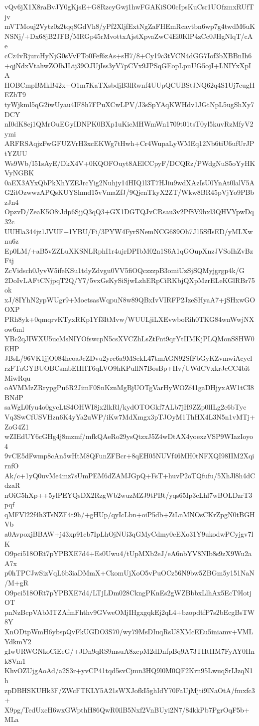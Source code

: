 vQv6jX1X8raBvJY0gKjsE+G8RzcyGwj1hwFGAKiSO0cIpsKuCsr1UOfzmxRUfTjv
mVTMouj2Vytz0z2tqq8GdVh8/yPf2XljfExtNgZaFHEmRcavtbn6wp7g4twdM6uK
NSNj/+Dx68jB2JFB/MRGp45rMvottxAjstXpvaZwC4Ei0KlP4zCc0JHgNlqT/cAe
cCz4vRjurcHyNjG0sVvFTo0Fef6zAs+sH7/8+Cy19c3tVCN4dGG7Iof3bXBBnIh6
+qjNdxVtahwZOlbJLtj39OJUjIss3yV7pCVx9JPSqGEopLpuUG5ojI+LNIYxXpIA
HOBCmpBMkB42x+O1m7KaTXsbdjB3lRwnf4UUpQCUBStJNQ62q4S1Uj7cugHEZhT9
tyWjkml5qG2iwUyau4IF8h7FPuXCwLPV/J3sSpYAqKWHdv1JGtNpL5ugShXy7DCY
nI0dK8cj1QMrOuEGyIDNPK0BXp1uKicMHWmWn1709t01tsT0yl5kuvRzMfyV2ymi
ARFRSAqjzFwGFUZVrH3xcEKWg7tHwh+Cr4WupaLyWMEq12Nb6tiU6ufUrJPtYZUU
Ws9Wb/I51sAyE/DkX4V+0KQOFOuyt8AElCCpyF/DCQRz/PWdgNuS5oYyHKVyNGBK
0aEX3AYxQbPkXhYZEJrcYig2Nuhjy14HIQ1l3T7HJiu9wdXAzIsU0YnAt0lalV5A
G2itOzwwzAPQsKUYShmd15vVmaZfJ/9QjenTkyX2ZT/Wkw8BR45pVjYo9PBbzJn4
OpzvD/ZeaK5O8iJdp6SjjQ3qQ3+GX1DGTQJvCRsau3v2Pf8V9hxl3QHVYpwDq32c
UUHla344jz1JVUF+1YBU/Fi/3PYW4FyrSNemNCG689Oh7J15SfIsED/yMLXwnu6z
Ep0LM/+aB5vZZLuXKSNLRphI1r4ujrDPIbM02n1S6A1qGOupXnzJVSoIhZvBzFtj
ZcVidsch0JyvW5ifeKSu1tdyZdvgu0VV5fiOQczzzpB3omiUzSjSQMyjgrgp4k/G
2DoIvLAFtCNjpqT2Q/Y7/5vxGsKySiSjwLzhERpCiRKbjQXpMzrELeKGlRBr75ok
xJ/8IYhN2ypWUgr9+MoetsasWqpuN8w89QBxIvVIRFP2JzeSHyaA7+jSHxwGOOXP
PRh8yk+0qmqrvKTyxRKp1Yf3ItMvw/WUULjiLXEvwboRih0TKG84wnWwjNXow6ml
YBc2qJIWXU5ucMsNIYOfswcpN5csXVCZhLsZtFnt9qrYtIIMKjPLQMonS8HW0EHP
JBsL/96VK1jjO084heoaJcZDvu2yre6a9MSekL47tmAGN92SfFbGyKZvmwiAcycl
rzFTuGYBUOBCsmbEHHT6qLVO9hKPullN7BosBp+Hv/UWdCVxkrJcCC4bitMiwRqu
oAVMMzZRrypgPu6R2JimF0SnKznMgBjUOTgVarHyWOZf41gaDHjyxAW1tCI8BNdP
saWgL0fyu4o0gycLtS4OHWI8jx2lkRl/kydOTOGkf7ALb7jH9ZZp0lILg2c6bTyc
Vq3SwCfUSVHzn6K4yYa2uWP/iKw7MdXmgx3pTJOyM1ThHX4L3N5n1vMTj+ZoG4Z1
wZIEdUY6cGHg4j8mzmf/mfkQAeRo29ysQtzxJ5Z4wDtAX4yoexzVSP9WIazIoyo4
9vCE5dFwmp8cAn5wHtM8QFunZFBcr+8qEH05NUVf46MH0tNFXQI98IIM2XqirnfO
Ak/c+1yQ0uvMe4mz7sUmPEM6dZAMJGpQ+FsT+huvP2oTQfufu/5XhJl8h4dCdzaR
nOiG5hXp++5ylPEYQsDX2RzgWb2wuzMZJ9tPBt/yqs65Ip3cLhl7wBOLDzrT3pqf
qMFVl22f4h3TsNZF4t9h/+gHUp/qyIcLbn+oiP5db+ZiLnMNOsCKrZpgN0tBGHVb
a0AvpoxjBBAW+j43xp91cb7IpLhOjNUi3qGMyCdmy0eEXo31Y9ukodwPCyjgv7lK
O9pci518ORt7pYPBXE7d4+Es0Uwu4/tUpMXb2eJ/eA6nbYV8NIb8s9zX9Wu2aA7x
p0hTPCJwSizVqL6b3iaDMmX+CkomUjXoO5vPuOCz56N9bw5ZBGm5y151NaN/M+gR
O9pci518ORt7pYPBXE7d4/LTjLDm028CkngPKnEs2gWZBbbxLlhAx5EcT9IotjOT
pnNzBcpVAbMTZAfmFhthv9GVweOMjIHgxgqkEj2qL4+bzopdtfP7s2bEcgBsTW8Y
XnODtpWmH6ybspQvFkUGDO3S70/wy79MsDIuqRsU8XMcEEu5iniamv+VMLYdkmY2
gIwURWGNkoCiEeG/+JDn9qRS9msuA8xepM2dDnfpBq9A73THtHM7FyAY0Hnk8Vm1
KhvOZUjgAoAd/a2S3r+yvCP41tqd5svCjmn3HQ9l0M0QF2Krn95LwuqSrIJzqN1h
zpDBHSKUHk3F/ZWcFTKLY5A21sWXJofkI5ghIdY70FaUjMjti9lNaOtA/fmxfc3+
X9pg/TedUxcH6wxGWpthH86QwR0ilB5Nxf2VnBUyi2N7/84kkPb7PgrOqF5b+MLa
